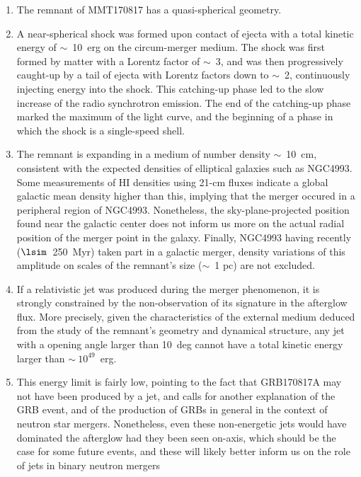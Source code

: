 \begin{enumerate}
    \item The remnant of MMT170817 has a quasi-spherical geometry.
    \item A near-spherical shock was formed upon contact of ejecta with a total kinetic energy of $\sim$~10~erg on the circum-merger medium. The shock was first formed by matter with a Lorentz factor of $\sim$~3, and was then progressively caught-up by a tail of ejecta with Lorentz factors down to $\sim$~2, continuously injecting energy into the shock. This catching-up phase led to the slow increase of the radio synchrotron emission. The end of the catching-up phase marked the maximum of the light curve, and the beginning of a phase in which the shock is a single-speed shell.

    \item The remnant is expanding in a medium of number density $\sim$~10~cm, consistent with the expected densities of elliptical galaxies such as NGC4993. Some measurements of HI densities using 21-cm fluxes indicate a global galactic mean density higher than this, implying that the merger occured in a peripheral region of NGC4993. Nonetheless, the sky-plane-projected position found near the galactic center does not inform us more on the actual radial position of the merger point in the galaxy. Finally, NGC4993 having recently ($\lsim$~250~Myr) taken part in a galactic merger, density variations of this amplitude on scales of the remnant's size ($\sim$~1 pc) are not excluded.

    \item If a relativistic jet was produced during the merger phenomenon, it is strongly constrained by the non-observation of its signature in the afterglow flux. More precisely, given the characteristics of the external medium deduced from the study of the remnant's geometry and dynamical structure, any jet with a opening angle larger than 10~deg cannot have a total kinetic energy larger than $\sim~10^{49}$~erg.

    \item This energy limit is fairly low, pointing to the fact that GRB170817A may not have been produced by a jet, and calls for another explanation of the GRB event, and of the production of GRBs in general in the context of neutron star mergers. Nonetheless, even these non-energetic jets would have dominated the afterglow had they been seen on-axis, which should be the case for some future events, and these will likely better inform us on the role of jets in binary neutron mergers
\end{enumerate}
